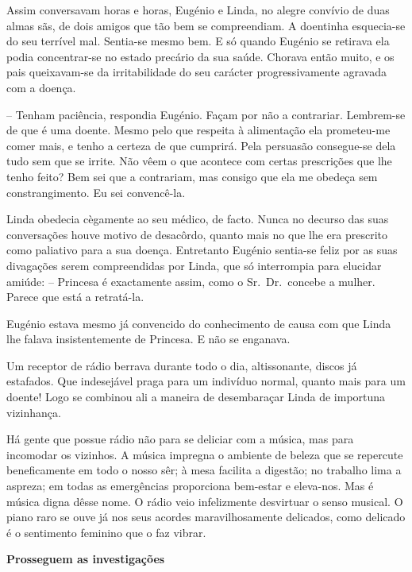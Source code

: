 \documentclass[9pt]{article}
\begin{document}
Assim conversavam horas e horas, Eugé\-nio e Linda, no alegre con\-ví\-vio de duas almas sãs, de dois amigos que tão bem se compreendiam.
A doentinha esquecia-se do seu terrível mal. Sentia-se mesmo bem. E
só quan\-do Eugé\-nio se retirava ela podia concentrar-se no estado precário da sua saúde. Chorava então muito, e os pais queixavam-se da
irritabilidade do seu carácter progressivamente agravada com a
doença.

-- Tenham paciência, respondia Eugé\-nio. Façam por não a contrariar.
Lembrem-se de que é uma doente. Mesmo pelo que respeita à alimenta\-ção
ela prometeu-me comer mais, e tenho a certeza de que cumprirá. Pela
persuasão consegue-se dela tudo sem que se irrite. Não vêem o que acontece com certas prescri\-ções que lhe tenho feito? Bem sei que a contrariam, mas consigo que ela me obedeça sem constrangimento. Eu sei
convencê-la.

Linda obedecia cègamente ao seu médico, de facto. Nunca no decurso das suas conversa\-ções houve motivo de desacôrdo, quanto mais no que
\-lhe era prescrito como paliativo para a sua doença. Entretanto Eugé\-nio sentia-se feliz por as suas divaga\-ções serem compreendidas por
Linda, que só interrompia para elucidar amiúde: -- Princesa é exactamente assim, como o Sr.\ Dr.\ concebe a mu\-lher. Parece que está a retratá-la.

Eugé\-nio estava mesmo já convencido do conhecimento de causa com
que Linda lhe falava insistentemente de Princesa. E não se enganava.

Um receptor de rádio berrava durante todo o dia, altissonante, discos já
estafados. Que indesejável praga para um indivíduo normal, quanto mais
para um doente! Logo se combinou ali a maneira de desem\-baraçar Linda de
importuna vizinhan\-ça.

Há gente que possue rádio não para se deliciar com a música, mas para
incomodar os vizinhos. A música impregna o ambiente de beleza que se repercute benefi\-camente em todo o nosso sêr; à mesa facilita a digestão; no
traba\-lho lima a aspreza; em todas as emergências proporciona bem-estar e
eleva-nos. Mas é música digna dêsse nome. O rádio veio infelizmente desvirtuar o senso musical. O piano raro se ouve já nos seus acordes maravi\-lhosamente delicados, como delicado é o sentimento feminino que o faz vibrar.

\begin{center}\bf\large Prosseguem as investiga\-ções\end{center}
\end{document}
